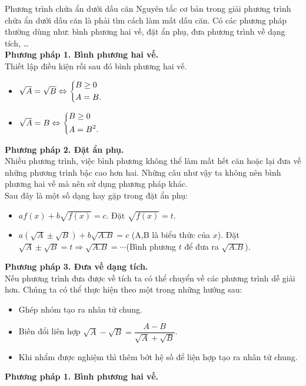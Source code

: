 \begin{dang}{Phương trình chứa ẩn dưới dấu căn}
	Nguyên tắc cơ bản trong giải phương trình chứa ẩn dưới dấu căn là phải tìm cách làm mất dấu căn. Có các phương pháp thường dùng như: bình phương hai vế, đặt ẩn phụ, đưa phương trình về dạng tích, \ldots\\
	
	\noindent\textbf{Phương pháp 1. Bình phương hai vế.}\\
	Thiết lập điều kiện rồi sau đó bình phương hai vế.
	\begin{itemize}
		\item $\sqrt{A}=\sqrt{B}\Leftrightarrow\left\{\begin{aligned}&B\geq 0\\&A=B.\end{aligned}\right.$
		\item $\sqrt{A}=B\Leftrightarrow\left\{\begin{aligned}&B\geq 0\\&A=B^2.\end{aligned}\right.$
	\end{itemize}
\noindent\textbf{Phương pháp 2. Đặt ẩn phụ.} \\
Nhiều phương trình, việc bình phương không thể làm mất hết căn hoặc lại đưa về những phương trình bậc cao hơn hai. Những câu như vậy ta không nên bình phương hai vế mà nên sử dụng phương pháp khác.\\
Sau đây là một số dạng hay gặp trong đặt ẩn phụ:
\begin{itemize}
	\item $af\left( x\right) +b\sqrt{ f\left( x\right) }=c  $. Đặt $ \sqrt{ f\left( x\right) }=t$.
	\item $ a(\sqrt{A}\pm\sqrt{B})+b\sqrt{A.B}=c $ (A,B là biểu thức của $x$). Đặt $ \sqrt{A}\pm\sqrt{B}=t \Rightarrow \sqrt{A.B}=\cdots $(Bình phương $t$ để đưa ra $\sqrt{A.B}$).
\end{itemize}

\noindent\textbf{Phương pháp 3. Đưa về dạng tích.}\\
Nếu phương trình đưa được về tích ta có thể chuyển về các phương trình dễ giải hơn. Chúng ta có thể thực hiện theo một trong những hướng sau:
\begin{itemize}
	\item Ghép nhóm tạo ra nhân tử chung.
	\item Biến đổi liên hợp $ \sqrt{A}-\sqrt{B}=\dfrac{A-B}{\sqrt{A}+\sqrt{B}} $.
	\item Khi nhẩm được nghiệm thì thêm bớt hệ số để liện hợp tạo ra nhân tử chung.
\end{itemize}

\end{dang}

\noindent\textbf{Phương pháp 1. Bình phương hai vế.}

